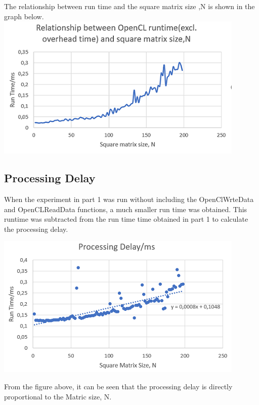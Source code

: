 The relationship between run time and the square matrix size ,N is shown in the graph below.
\\
\vspace{2mm}
\includegraphics{Figures/part2.PNG}

\subsection{Processing Delay}
When the experiment in part 1 was run without including the OpenClWrteData and OpenCLReadData functions, a much smaller run time was obtained. This runtime was subtracted from the run time time obtained in part 1 to calculate the processing delay. 

\vspace{2mm}
\includegraphics{Figures/processing_delay.PNG}

From the figure above, it can be seen that the processing delay is directly proportional to the Matric size, N.
\\
